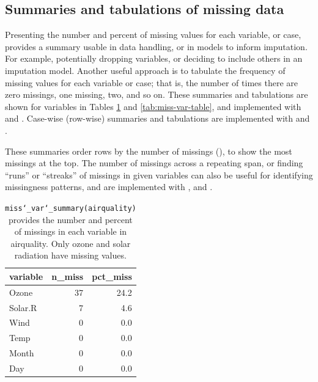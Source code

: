 \documentclass[
]{jss}
\begin{document}
\hypertarget{sum-tab-missings}{%
\subsection{Summaries and tabulations of missing data}\label{sum-tab-missings}}

Presenting the number and percent of missing values for each variable, or case, provides a summary usable in data handling, or in models to inform imputation. For example, potentially dropping variables, or deciding to include others in an imputation model. Another useful approach is to tabulate the frequency of missing values for each variable or case; that is, the number of times there are zero missings, one missing, two, and so on. These summaries and tabulations are shown for variables in Tables \ref{tab:miss-var-summary} and \ref{tab:miss-var-table}, and implemented with  and . Case-wise (row-wise) summaries and tabulations are implemented with  and .

These summaries order rows by the number of missings (), to show the most missings at the top. The number of missings across a repeating span, or finding ``runs'' or ``streaks'' of missings in given variables can also be useful for identifying missingness patterns, and are implemented with , and .

\begin{CodeChunk}
\begin{table}

\caption{\label{tab:miss-var-summary}\texttt{miss\char`_var\char`_summary(airquality)} provides the number and percent of missings in each variable in airquality. Only ozone and solar radiation have missing values.}
\centering
\begin{tabular}[t]{l|r|r}
\hline
variable & n\_miss & pct\_miss\\
\hline
Ozone & 37 & 24.2\\
\hline
Solar.R & 7 & 4.6\\
\hline
Wind & 0 & 0.0\\
\hline
Temp & 0 & 0.0\\
\hline
Month & 0 & 0.0\\
\hline
Day & 0 & 0.0\\
\hline
\end{tabular}
\end{table}

\end{CodeChunk}
\end{document}
